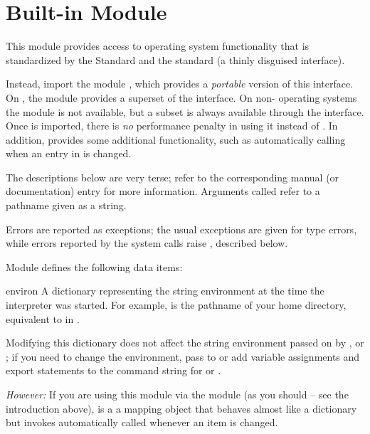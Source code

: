\section{Built-in Module }
\label{module-posix}

This module provides access to operating system functionality that is
standardized by the \C{} Standard and the \POSIX{} standard (a thinly
disguised \UNIX{} interface).

  Instead, import the
module , which provides a \emph{portable} version of this
interface.  On \UNIX{}, the  module provides a superset of
the  interface.  On non-\UNIX{} operating systems the
 module is not available, but a subset is always
available through the  interface.  Once  is
imported, there is \emph{no} performance penalty in using it instead
of .  In addition,  provides some additional
functionality, such as automatically calling 
when an entry in  is changed.

The descriptions below are very terse; refer to the corresponding
\UNIX{} manual (or \POSIX{} documentation) entry for more information.
Arguments called  refer to a pathname given as a string.

Errors are reported as exceptions; the usual exceptions are given
for type errors, while errors reported by the system calls raise
, described below.

Module  defines the following data items:

\begin{datadesc}{environ}
A dictionary representing the string environment at the time
the interpreter was started.
For example,
is the pathname of your home directory, equivalent to
in \C{}.

Modifying this dictionary does not affect the string environment
passed on by ,  or
; if you need to change the environment, pass
 to  or add variable assignments and
export statements to the command string for  or
.

\emph{However:} If you are using this module via the 
module (as you should -- see the introduction above), 
is a a mapping object that behaves almost like a dictionary but
invokes  automatically called whenever an item is
changed.
\end{datadesc}


